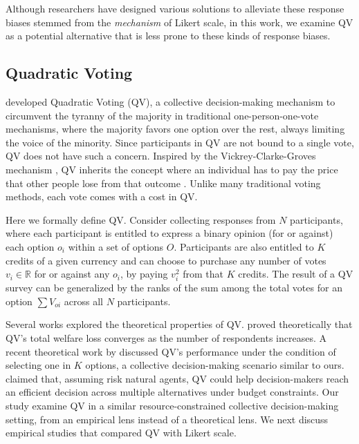 Although researchers have designed various solutions to alleviate these response biases stemmed from the \textit{mechanism} of Likert scale, in this work, we examine QV as a potential alternative that is less prone to these kinds of response biases.

\subsection{Quadratic Voting}
\textcite{posner2018radical} developed Quadratic Voting (QV), a collective decision-making mechanism \cite{lalley2018quadratic} to circumvent the tyranny of the majority in traditional one-person-one-vote mechanisms, where the majority favors one option over the rest, always limiting the voice of the minority. Since participants in QV are not bound to a single vote, QV does not have such a concern. Inspired by the Vickrey-Clarke-Groves mechanism \cite{roughgarden2010algorithmic}, QV inherits the concept where an individual has to pay the price that other people lose from that outcome \cite{posner2018radical}. Unlike many traditional voting methods, each vote comes with a cost in QV. 


Here we formally define QV. Consider collecting responses from $N$ participants, where each participant is entitled to express a binary opinion (for or against) each option $o_i$ within a set of options $O$. Participants are also entitled to $K$ credits of a given currency and can choose to purchase any number of votes $v_i \in \mathbb{R}$ for or against any $o_i$, by paying $v_i^2$ from that $K$ credits. The result of a QV survey can be generalized by the ranks of the sum among the total votes for an option $\sum{V_{oi}}$ across all $N$ participants.\par

Several works explored the theoretical properties of QV. \textcite{lalley2018quadratic} proved theoretically that QV's total welfare loss converges as the number of respondents increases. A recent theoretical work by \textcite{eguia2019quadratic} discussed QV's performance under the condition of selecting one in $K$ options, a collective decision-making scenario similar to ours. \textcite{eguia2019quadratic} claimed that, assuming risk natural agents, QV could help decision-makers reach an efficient decision across multiple alternatives under budget constraints. Our study examine QV in a similar resource-constrained collective decision-making setting, from an empirical lens instead of a theoretical lens. We next discuss empirical studies that compared QV with Likert scale.


